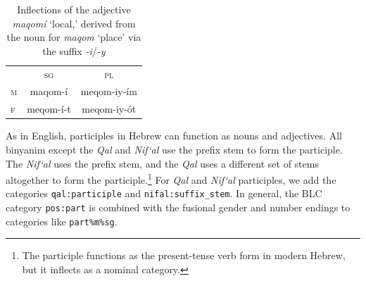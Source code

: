 {\begin{description}
\begin{table}[bt]
\centering
\small
\setlength{\extrarowheight}{8pt}
\begin{tabular}{lcc}
\toprule
& \textsc{sg} & \textsc{pl}  \\
\cmidrule(lr){2-3}
\textsc{m} & maqom-\'{i} &  meqom-iy-\'{i}m\\
\textsc{f} & meqom-\'{i}-t  & meqom-iy-\'{o}t  \\
\bottomrule
\end{tabular}
\caption{Inflections of the adjective \textit{maqom\'{i}} `local,' derived from the noun for \textit{maqom} `place' via the suffix \textit{-i}/\textit{-y}}
\label{tab:der-adjs}
\end{table}




\item[Participles.]
As in English, participles in Hebrew can function as nouns and adjectives.
All binyanim except the \textit{Qal} and \textit{Nif`al} use 
the prefix stem to form the participle. The \textit{Nif`al} uses the prefix stem, 
and the \textit{Qal} uses a different set of stems altogether to form the 
participle.\footnote{The participle functions as the present-tense verb form in modern Hebrew, but it inflects as a nominal category.}
For \textit{Qal} and \textit{Nif`al} participles, we add the categories \texttt{qal:participle} 
and \texttt{nifal:suffix\_stem}.  In general, the BLC category \texttt{pos:part} 
is combined with the fusional gender and number endings to categories like \texttt{part\%m\%sg}.


\end{description}}
